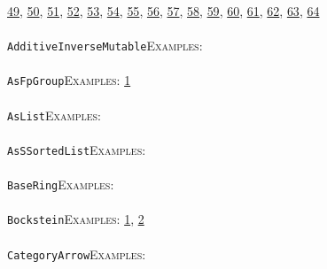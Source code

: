 \documentclass[a4paper,11pt]{report}
\begin{document}
{{\href{../www/SideLinks/About/aboutSpaceGroup.html} {49}{\nobreakspace}, \href{../www/SideLinks/About/aboutFunctorial.html} {50}{\nobreakspace}, \href{../www/SideLinks/About/aboutSuperperfect.html} {51}{\nobreakspace}, \href{../www/SideLinks/About/aboutGouter.html} {52}{\nobreakspace}, \href{../www/SideLinks/About/aboutSurvey.html} {53}{\nobreakspace}, \href{../www/SideLinks/About/aboutGraphsOfGroups.html} {54}{\nobreakspace}, \href{../www/SideLinks/About/aboutTDA.html} {55}{\nobreakspace}, \href{../www/SideLinks/About/aboutIntro.html} {56}{\nobreakspace}, \href{../www/SideLinks/About/aboutKnots.html} {57}{\nobreakspace}, \href{../www/SideLinks/About/aboutTensorSquare.html} {58}{\nobreakspace}, \href{../www/SideLinks/About/aboutKnotsQuandles.html} {59}{\nobreakspace}, \href{../www/SideLinks/About/aboutTopology.html} {60}{\nobreakspace}, \href{../www/SideLinks/About/aboutLieCovers.html} {61}{\nobreakspace}, \href{../www/SideLinks/About/aboutTorAndExt.html} {62}{\nobreakspace}, \href{../www/SideLinks/About/aboutLie.html} {63}{\nobreakspace}, \href{../www/SideLinks/About/aboutTwistedCoefficients.html} {64}{\nobreakspace} \\
 \\
 \texttt{AdditiveInverseMutable}{\nobreakspace}{\nobreakspace}{\nobreakspace}{\nobreakspace}\textsc{Examples:} \\
 \\
 \texttt{AsFpGroup}{\nobreakspace}{\nobreakspace}{\nobreakspace}{\nobreakspace}\textsc{Examples:} \href{tutorial/chap10.html} {1}{\nobreakspace} \\
 \\
 \texttt{AsList}{\nobreakspace}{\nobreakspace}{\nobreakspace}{\nobreakspace}\textsc{Examples:} \\
 \\
 \texttt{AsSSortedList}{\nobreakspace}{\nobreakspace}{\nobreakspace}{\nobreakspace}\textsc{Examples:} \\
 \\
 \texttt{BaseRing}{\nobreakspace}{\nobreakspace}{\nobreakspace}{\nobreakspace}\textsc{Examples:} \\
 \\
 \texttt{Bockstein}{\nobreakspace}{\nobreakspace}{\nobreakspace}{\nobreakspace}\textsc{Examples:} \href{tutorial/chap7.html} {1}{\nobreakspace}, \href{../www/SideLinks/About/aboutModPRings.html} {2}{\nobreakspace} \\
 \\
 \texttt{CategoryArrow}{\nobreakspace}{\nobreakspace}{\nobreakspace}{\nobreakspace}\textsc{Examples:} \\
}}
\end{document}
